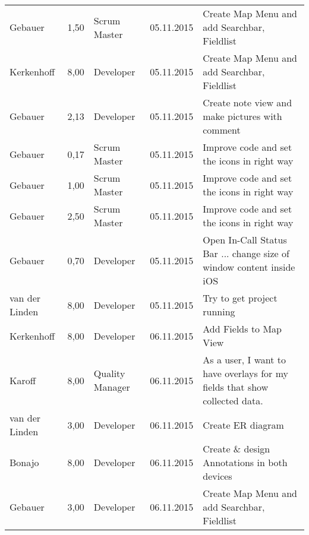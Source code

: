 \begin{longtable}{ l r p{2cm} c p{4cm} }
		Gebauer                 & 1,50           & Scrum Master          & 05.11.2015    & Create Map Menu and add Searchbar, Fieldlist                                    \\
		Kerkenhoff              & 8,00           & Developer             & 05.11.2015    & Create Map Menu and add Searchbar, Fieldlist                                    \\
		Gebauer                 & 2,13           & Developer             & 05.11.2015    & Create note view and make pictures with comment                                 \\
		Gebauer                 & 0,17           & Scrum Master          & 05.11.2015    & Improve code and set the icons in right way                                     \\
		Gebauer                 & 1,00           & Scrum Master          & 05.11.2015    & Improve code and set the icons in right way                                     \\
		Gebauer                 & 2,50           & Scrum Master          & 05.11.2015    & Improve code and set the icons in right way                                     \\
		Gebauer                 & 0,70           & Developer             & 05.11.2015    & Open In-Call Status Bar ... change size of window content inside iOS            \\
		van der Linden          & 8,00           & Developer             & 05.11.2015    & Try to get project running                                                      \\
		Kerkenhoff              & 8,00           & Developer             & 06.11.2015    & Add Fields to Map View                                                          \\
		Karoff                  & 8,00           & Quality Manager       & 06.11.2015    & As a user, I want to have overlays for my fields that show collected data.      \\
		van der Linden          & 3,00           & Developer             & 06.11.2015    & Create ER diagram                                                                \\
		Bonajo                  & 8,00           & Developer             & 06.11.2015    & Create \& design Annotations in both devices                                    \\
		Gebauer                 & 3,00           & Developer             & 06.11.2015    & Create Map Menu and add Searchbar, Fieldlist                                    \\

\end{longtable}
